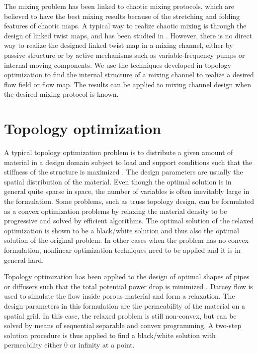 The mixing problem has been linked to chaotic mixing protocols, which
are believed to have the best mixing results because of the stretching and
folding features of chaotic maps. A typical way to realize chaotic
mixing is through the design of linked twist maps, and has been
studied in \cite{Wiggins2004}. However, there is no direct way to
realize the designed linked twist map in a mixing channel, either by
passive structure or by active mechanisms such as variable-frequency
pumps or internal moving components. We use the
techniques developed in topology optimization to find the internal
structure of a mixing channel to realize a desired flow field or flow
map. The results can be applied to mixing channel design when the
desired mixing protocol is known.

\section{Topology optimization}
A typical topology optimization problem is to distribute a given amount of material in a design domain subject to load and support
conditions such that the stiffness of the structure is maximized \cite{Bendsoe2003}. The design parameters are usually the spatial
distribution of the material. Even though the optimal solution is in general quite sparse in space, the number of variables is often
inevitably large in the formulation. Some problems, such as truss topology design, can be formulated as a convex optimization
problems \cite{BenTal1997} by relaxing the material density to be progressive and solved by efficient algorithms. The optimal solution of
the relaxed optimization is shown to be a black/white solution and thus also the optimal solution of the original problem. In other cases
when the problem has no convex formulation, nonlinear optimization techniques need to be applied and it is in general hard.


Topology optimization has been applied to the design of optimal shapes
of pipes or diffusers such that the total potential power drop is
minimized \cite{Evgrafov2005, Borrvall2003}. Darcey flow is used to
simulate the flow inside porous material and form a relaxation. The
design parameters in this formulation are the permeability of the
material on a spatial grid. In this case, the relaxed problem is still
non-convex, but can be solved by means of sequential separable and
convex programming. A two-step solution procedure is thus applied to
find a black/white solution with permeability either $0$ or infinity
at a point.

